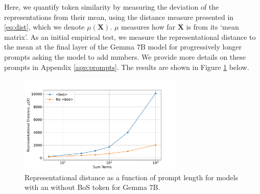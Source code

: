 \documentclass{article} %
\newcommand{\Xb}{\mathbf{X}}
\begin{document}
Here, we quantify token similarity by measuring the deviation of the representations from their mean, using the distance measure presented in \eqref{eq:dist}, which we denote $\mu(\Xb)$. $\mu$ measures how far $\Xb$ is from its `mean matrix'. As an initial empirical test, we measure the representational distance to the mean at the final layer of the Gemma 7B model for progressively longer prompts asking the model to add numbers. We provide more details on these prompts in Appendix \ref{app:prompts}. The results are shown in Figure \ref{fig:rep_collapse_7b} below. 


\begin{figure}[H]
    \centering
    \includegraphics[width=0.7\textwidth]{figures/smoothing.pdf} %
    \caption{Representational distance as a function of prompt length for models with an without BoS token for Gemma 7B.}%
    \label{fig:rep_collapse_7b}%
\end{figure}
\end{document}

